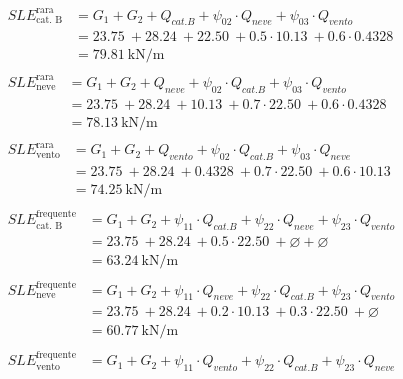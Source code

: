 \begin{align}
	\begin{split}
	SLE^{\text{rara}}_{\text{cat. B}} &= G_1 + G_2 + Q_{cat. B} + \psi_{02}\cdot Q_{neve} + \psi_{03}\cdot Q_{vento}  \\
	&= \SI{23.75}{} + \SI{28.24}{} + \SI{22.50}{} + 0.5\cdot\SI{10.13}{} + 0.6\cdot\SI{0.4328}{}\\
	&= \SI{79.81}{\kilo\newton\per\meter}
	\end{split} \\ 
	\begin{split}
	SLE^{\text{rara}}_{\text{neve}} &= G_1 + G_2 + Q_{neve} + \psi_{02}\cdot Q_{cat. B} + \psi_{03}\cdot Q_{vento}  \\
	&= \SI{23.75}{} + \SI{28.24}{} + \SI{10.13}{} + 0.7\cdot\SI{22.50}{} + 0.6\cdot\SI{0.4328}{}\\
	&= \SI{78.13}{\kilo\newton\per\meter}
	\end{split} \\ 
	\begin{split}
	SLE^{\text{rara}}_{\text{vento}} &= G_1 + G_2 + Q_{vento} + \psi_{02}\cdot Q_{cat. B} + \psi_{03}\cdot Q_{neve}  \\
	&= \SI{23.75}{} + \SI{28.24}{} + \SI{0.4328}{} + 0.7\cdot\SI{22.50}{} + 0.6\cdot\SI{10.13}{}\\
	&= \SI{74.25}{\kilo\newton\per\meter}
	\end{split} \\ 
	\begin{split}
	SLE^{\text{frequente}}_{\text{cat. B}} &= G_1 + G_2 + \psi_{11}\cdot Q_{cat. B} + \psi_{22}\cdot Q_{neve} + \psi_{23}\cdot Q_{vento}  \\
	&= \SI{23.75}{} + \SI{28.24}{} + 0.5\cdot\SI{22.50}{} + \varnothing +\varnothing\\
	&= \SI{63.24}{\kilo\newton\per\meter}
	\end{split} \\ 
	\begin{split}
	SLE^{\text{frequente}}_{\text{neve}} &= G_1 + G_2 + \psi_{11}\cdot Q_{neve} + \psi_{22}\cdot Q_{cat. B} + \psi_{23}\cdot Q_{vento}  \\
	&= \SI{23.75}{} + \SI{28.24}{} + 0.2\cdot\SI{10.13}{} + 0.3\cdot\SI{22.50}{} + \varnothing \\
	&= \SI{60.77}{\kilo\newton\per\meter}
	\end{split} \\ 
	\begin{split}
	SLE^{\text{frequente}}_{\text{vento}} &= G_1 + G_2 + \psi_{11}\cdot Q_{vento} + \psi_{22}\cdot Q_{cat. B} + \psi_{23}\cdot Q_{neve}  \\

\end{split}
\end{align}
